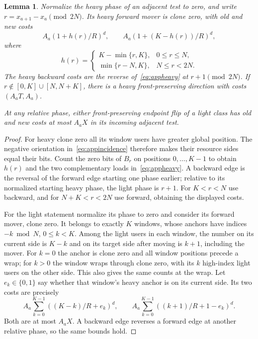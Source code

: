 \documentclass[11pt]{article}
\newtheorem{lemma}[theorem]{Lemma}
\theoremstyle{definition}
\begin{document}
\begin{lemma}\label{lem:appendpoints}
Normalize the heavy phase of an adjacent test to zero, and write $r=x_{a+1}-x_a\pmod{2N}$. Its heavy forward mover is clone zero, with old and new costs
\begin{equation}\label{eq:appheavy}
 A_a(1+h(r)/R)^d,\qquad
 A_a(1+(K-h(r))/R)^d,
\end{equation}
where
\[
 h(r)=\begin{cases}
 K-\min\{r,K\},&0\le r\le N,\\
 \min\{r-N,K\},&N\le r<2N.
 \end{cases}
\]
The heavy backward costs are the reverse of~\eqref{eq:appheavy} at $r+1\pmod{2N}$. If $r\notin[0,K]\cup[N,N+K]$, there is a heavy front-preserving direction with costs $(A_aT,A_a)$.

At any relative phase, either front-preserving endpoint flip of a light class has old and new costs at most $A_aX$ in its incoming adjacent test.
\end{lemma}
\begin{proof}
For heavy clone zero all its window users have greater global position. The negative orientation in~\eqref{eq:appincidence} therefore makes their resource sides equal their bits. Count the zero bits of $B_r$ on positions $0,\ldots,K-1$ to obtain $h(r)$ and the two complementary loads in~\eqref{eq:appheavy}. A backward edge is the reversal of the forward edge starting one phase earlier; relative to its normalized starting heavy phase, the light phase is $r+1$. For $K<r<N$ use backward, and for $N+K<r<2N$ use forward, obtaining the displayed costs.

For the light statement normalize its phase to zero and consider its forward mover, clone zero. It belongs to exactly $K$ windows, whose anchors have indices $-k\bmod N$, $0\le k<K$. Among the light users in each window, the number on its current side is $K-k$ and on its target side after moving is $k+1$, including the mover. For $k=0$ the anchor is clone zero and all window positions precede a wrap; for $k>0$ the window wraps through clone zero, with its $k$ high-index light users on the other side. This also gives the same counts at the wrap. Let $e_k\in\{0,1\}$ say whether that window's heavy anchor is on its current side. Its two costs are precisely
\begin{equation}\label{eq:applight}
 A_a\sum_{k=0}^{K-1}((K-k)/R+e_k)^d,\qquad
 A_a\sum_{k=0}^{K-1}((k+1)/R+1-e_k)^d.
\end{equation}
Both are at most $A_aX$. A backward edge reverses a forward edge at another relative phase, so the same bounds hold.
\end{proof}
\end{document}
